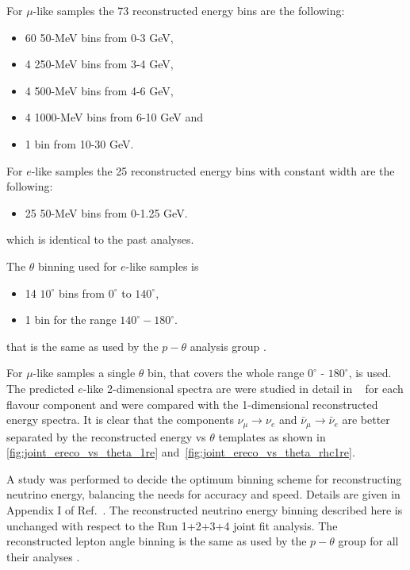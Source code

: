 For $\mu$-like samples the 73 reconstructed energy bins are the following:
\begin{itemize}
 \item   60 50-MeV bins from 0-3 GeV, 
 \item   4 250-MeV bins from 3-4 GeV, 
 \item   4 500-MeV bins from 4-6 GeV, 
 \item   4 1000-MeV bins from 6-10 GeV and
 \item   1 bin from 10-30 GeV.
\end{itemize}

For $e$-like samples the 25 reconstructed energy bins with constant width are the following:
\begin{itemize}
 \item   25 50-MeV bins from 0-1.25 GeV.
\end{itemize}
which is identical to the past analyses.

The $\theta$ binning used for $e$-like samples is
\begin{itemize}
 \item 14 $10^{\circ}$ bins from $0^{\circ}$ to $140^{\circ}$, 
 \item  1 bin for the range $140^{\circ} - 180^{\circ}$. 
\end{itemize}
that is the same as used by the $p-\theta$ analysis group \cite{ptheta}.

For $\mu$-like samples a single $\theta$ bin, that covers the whole range $0^{\circ}$ - $180^{\circ}$, is used.
The predicted $e$-like 2-dimensional spectra are were studied in detail in ~\cite{OurRun1617b17cJointAnalysis3Flavour} for each flavour component
and were compared with the 1-dimensional reconstructed energy spectra.
It is clear that the components $\nu_{\mu} \rightarrow \nu_e$ 
and $\bar{\nu}_{\mu} \rightarrow \bar{\nu}_e$ are better separated by the 
reconstructed energy vs $\theta$ templates as shown in \cref{fig:joint_ereco_vs_theta_1re} and~\ref{fig:joint_ereco_vs_theta_rhc1re}.

A study was performed to decide the optimum binning scheme for reconstructing neutrino energy, balancing the needs for accuracy and speed.
Details are given in Appendix I of Ref.\ \cite{OurRun123DisappAnalysis3Flavour}. 
The reconstructed neutrino energy binning described here is unchanged with respect to the Run 1+2+3+4 joint fit analysis.
The reconstructed lepton angle binning is the same as used by the $p-\theta$ group for all their analyses \cite{ptheta}.

